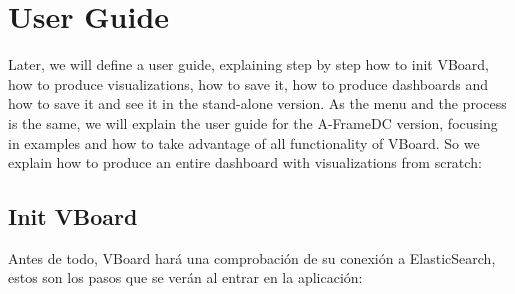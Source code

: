 \documentclass[a4paper, 12pt]{book}
\begin{document}
\section{User Guide}

Later, we will define a user guide, explaining step by step how to init VBoard, how to produce visualizations, how to save it, how to produce dashboards and how to save it and see it in the stand-alone version.  As the menu and the process is the same, we will explain the user guide for the A-FrameDC version, focusing in examples and how to take advantage of all functionality of VBoard. So we explain how to produce an entire dashboard with visualizations from scratch:

\subsection{Init VBoard}

Antes de todo, VBoard hará una comprobación de su conexión a ElasticSearch, estos son los pasos que se verán al entrar en la aplicación:
\end{document}
